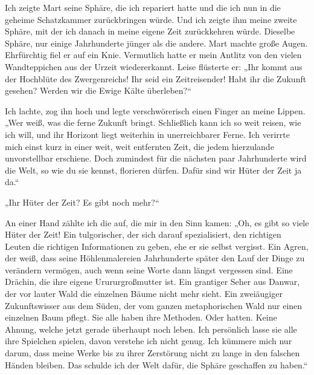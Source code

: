 Ich zeigte Mart seine Sphäre, die ich repariert hatte und die ich nun in die geheime Schatzkammer zurückbringen würde. Und ich zeigte ihm meine zweite Sphäre, mit der ich danach in meine eigene Zeit zurückkehren würde. Dieselbe Sphäre, nur einige Jahrhunderte jünger als die andere. Mart machte große Augen. Ehrfürchtig fiel er auf ein Knie. Vermutlich hatte er mein Antlitz von den vielen Wandteppichen aus der Urzeit wiedererkannt. Leise flüsterte er: „Ihr kommt aus der Hochblüte des Zwergenreichs! Ihr seid ein Zeitreisender! Habt ihr die Zukunft gesehen? Werden wir die Ewige Kälte überleben?“ 

Ich lachte, zog ihn hoch und legte verschwörerisch einen Finger an meine Lippen. „Wer weiß, was die ferne Zukunft bringt. Schließlich kann ich so weit reisen, wie ich will, und ihr Horizont liegt weiterhin in unerreichbarer Ferne. Ich verirrte mich einst kurz in einer weit, weit entfernten Zeit, die jedem hierzulande unvorstellbar erschiene. Doch zumindest für die nächsten paar Jahrhunderte wird die Welt, so wie du sie kennst, florieren dürfen. Dafür sind wir Hüter der Zeit ja da.“ 

„Ihr Hüter der Zeit? Es gibt noch mehr?“

An einer Hand zählte ich die auf, die mir in den Sinn kamen: „Oh, es gibt so viele Hüter der Zeit! Ein tulgorischer, der sich darauf spezialisiert, den richtigen Leuten die richtigen Informationen zu geben, ehe er sie selbst vergisst. Ein Agren, der weiß, dass seine Höhlenmalereien Jahrhunderte später den Lauf der Dinge zu verändern vermögen, auch wenn seine Worte dann längst vergessen sind. Eine Drächin, die ihre eigene Urururgroßmutter ist. Ein grantiger Seher aus Danwar, der vor lauter Wald die einzelnen Bäume nicht mehr sieht. Ein zweiäugiger Zukunftswisser aus dem Süden, der vom ganzen metaphorischen Wald nur einen einzelnen Baum pflegt. Sie alle haben ihre Methoden. Oder hatten. Keine Ahnung, welche jetzt gerade überhaupt noch leben. Ich persönlich lasse sie alle ihre Spielchen spielen, davon verstehe ich nicht genug. Ich kümmere mich nur darum, dass meine Werke bis zu ihrer Zerstörung nicht zu lange in den falschen Händen bleiben. Das schulde ich der Welt dafür, die Sphäre geschaffen zu haben.“ 

